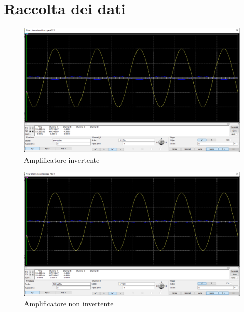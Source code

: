 \documentclass[12pt]{article}
\begin{document}
\section{Raccolta dei dati}
\begin{figure}[h]
    \centering
    \includegraphics[scale=0.2]{aoinv.png}
    \caption{Amplificatore invertente}
\end{figure}
\begin{figure}[h]
    \centering
    \includegraphics[scale=0.2]{aoinv.png}
    \caption{Amplificatore non invertente}
\end{figure}
\end{document}
